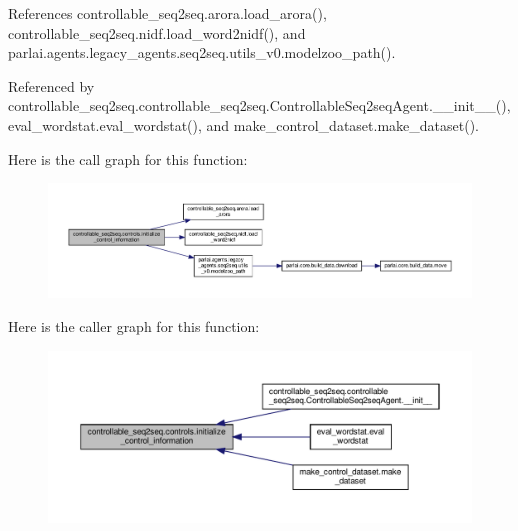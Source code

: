 References controllable\+\_\+seq2seq.\+arora.\+load\+\_\+arora(), controllable\+\_\+seq2seq.\+nidf.\+load\+\_\+word2nidf(), and parlai.\+agents.\+legacy\+\_\+agents.\+seq2seq.\+utils\+\_\+v0.\+modelzoo\+\_\+path().



Referenced by controllable\+\_\+seq2seq.\+controllable\+\_\+seq2seq.\+Controllable\+Seq2seq\+Agent.\+\_\+\+\_\+init\+\_\+\+\_\+(), eval\+\_\+wordstat.\+eval\+\_\+wordstat(), and make\+\_\+control\+\_\+dataset.\+make\+\_\+dataset().

Here is the call graph for this function\+:
\nopagebreak
\begin{figure}[H]
\begin{center}
\leavevmode
\includegraphics[width=350pt]{namespacecontrollable__seq2seq_1_1controls_a7c6540f026d763dbf534f1a3e60500a3_cgraph}
\end{center}
\end{figure}
Here is the caller graph for this function\+:
\nopagebreak
\begin{figure}[H]
\begin{center}
\leavevmode
\includegraphics[width=350pt]{namespacecontrollable__seq2seq_1_1controls_a7c6540f026d763dbf534f1a3e60500a3_icgraph}
\end{center}
\end{figure}
\mbox{\label{namespacecontrollable__seq2seq_1_1controls_a311eb502ed6cb93b69800a8a00ebc5e9}} 
